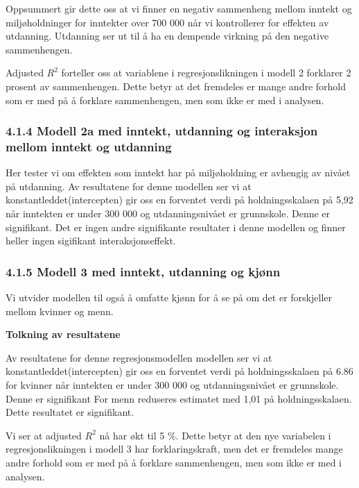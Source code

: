 \documentclass[
  12pt,
  letterpaper,
  DIV=11,
  numbers=noendperiod]{scrartcl}
\begin{document}
Oppsummert gir dette oss at vi finner en negativ sammenheng mellom
inntekt og miljøholdninger for inntekter over 700 000 når vi
kontrollerer for effekten av utdanning. Utdanning ser ut til å ha en
dempende virkning på den negative sammenhengen.

Adjusted \(R^2\) forteller oss at variablene i regresjonslikningen i
modell 2 forklarer 2 prosent av sammenhengen. Dette betyr at det
fremdeles er mange andre forhold som er med på å forklare sammenhengen,
men som ikke er med i analysen.

\hypertarget{modell-2a-med-inntekt-utdanning-og-interaksjon-mellom-inntekt-og-utdanning}{%
\subsubsection{4.1.4 Modell 2a med inntekt, utdanning og interaksjon
mellom inntekt og
utdanning}\label{modell-2a-med-inntekt-utdanning-og-interaksjon-mellom-inntekt-og-utdanning}}

Her tester vi om effekten som inntekt har på miljøholdning er avhengig
av nivået på utdanning. Av resultatene for denne modellen ser vi at
konstantleddet(intercepten) gir oss en forventet verdi på
holdningsskalaen på 5,92 når inntekten er under 300 000 og
utdanningsnivået er grunnskole. Denne er signifikant. Det er ingen andre
signifikante resultater i denne modellen og finner heller ingen
sigifikant interaksjonseffekt.

\hypertarget{modell-3-med-inntekt-utdanning-og-kjuxf8nn}{%
\subsubsection{4.1.5 Modell 3 med inntekt, utdanning og
kjønn}\label{modell-3-med-inntekt-utdanning-og-kjuxf8nn}}

Vi utvider modellen til også å omfatte kjønn for å se på om det er
forskjeller mellom kvinner og menn.

\textbf{Tolkning av resultatene}

Av resultatene for denne regresjonsmodellen modellen ser vi at
konstantleddet(intercepten) gir oss en forventet verdi på
holdningsskalaen på 6.86 for kvinner når inntekten er under 300 000 og
utdanningsnivået er grunnskole. Denne er signifikant For menn reduseres
estimatet med 1,01 på holdningsskalaen. Dette resultatet er signifikant.

Vi ser at adjusted \(R^2\) nå har økt til 5 \%. Dette betyr at den nye
variabelen i regresjonslikningen i modell 3 har forklaringskraft, men
det er fremdeles mange andre forhold som er med på å forklare
sammenhengen, men som ikke er med i analysen.
\end{document}
